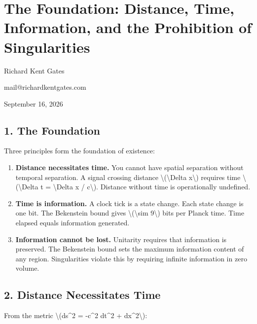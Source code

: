 \documentclass[
  10pt,
]{article}
\author{}
\date{}
\providecommand{\tightlist}{%
  \setlength{\itemsep}{0pt}\setlength{\parskip}{0pt}}
\begin{document}
\hypertarget{the-foundation-distance-time-information-and-the-prohibition-of-singularities}{%
\section{The Foundation: Distance, Time, Information, and the
Prohibition of
Singularities}\label{the-foundation-distance-time-information-and-the-prohibition-of-singularities}}

Richard Kent Gates

mail@richardkentgates.com

September 16, 2026

\hypertarget{the-foundation}{%
\subsection{1. The Foundation}\label{the-foundation}}

Three principles form the foundation of existence:

\begin{enumerate}
\tightlist
\item
  \textbf{Distance necessitates time.} You cannot have spatial
  separation without temporal separation. A signal crossing distance
  \textbackslash(\textbackslash Delta x\textbackslash) requires time
  \textbackslash(\textbackslash Delta t = \textbackslash Delta x /
  c\textbackslash). Distance without time is operationally undefined.
\item
  \textbf{Time is information.} A clock tick is a state change. Each
  state change is one bit. The Bekenstein bound gives
  \textbackslash(\textbackslash sim 9\textbackslash) bits per Planck
  time. Time elapsed equals information generated.
\item
  \textbf{Information cannot be lost.} Unitarity requires that
  information is preserved. The Bekenstein bound sets the maximum
  information content of any region. Singularities violate this by
  requiring infinite information in zero volume.
\end{enumerate}

\hypertarget{distance-necessitates-time}{%
\subsection{2. Distance Necessitates
Time}\label{distance-necessitates-time}}

From the metric \textbackslash(ds\^{}2 = -c\^{}2 dt\^{}2 +
dx\^{}2\textbackslash):
\end{document}
